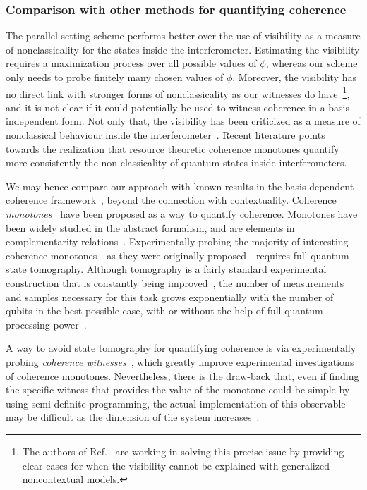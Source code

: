 \documentclass[a4paper,twocolumn,11pt,accepted=2024-01-17]{quantumarticle}
\begin{document}
\subsubsection{Comparison with other methods for quantifying coherence}
The parallel setting scheme performs better over the use of visibility as a measure of nonclassicality for the states inside the interferometer. Estimating the visibility requires a maximization process over all possible values of $\phi$, whereas our scheme only needs to probe finitely many chosen values of $\phi$. Moreover, the visibility has no direct link with stronger forms of nonclassicality as our witnesses do have~\footnote{The authors of Ref.~\cite{catani2021interference} are working in solving this precise issue by providing clear cases for when the visibility cannot be explained with generalized noncontextual models.}, and it is not clear if it could potentially be used to witness coherence in a basis-independent form. Not only that, the visibility has been criticized as a measure of nonclassical behaviour inside the interferometer~\cite{chrysosthemos_quantum_2022}. Recent literature points towards the realization that resource theoretic coherence monotones quantify more consistently the non-classicality of quantum states inside interferometers.


We may hence compare our approach with known results in the basis-dependent coherence framework~\cite{baumgratz2014quantifying,wu2021experimental}, beyond the connection with contextuality. Coherence \textit{monotones}~\cite{Streltsov17,wu2021experimental} have been proposed as a way to quantify coherence. Monotones have been widely studied in the abstract formalism, and are elements in complementarity relations~\cite{Streltsov17,wu2021experimental}. Experimentally probing the majority of interesting coherence monotones - as they were originally proposed - requires full quantum state tomography. Although tomography is a fairly standard experimental construction that is constantly being improved~\cite{rambach2021robust}, the number of measurements and samples necessary for this task grows exponentially with the number of qubits in the best possible case, with or without the help of full quantum processing power~\cite{chen2022tight}. 

A way to avoid state tomography for quantifying coherence is via experimentally probing \textit{coherence witnesses}~\cite{zhang2018estimating,wu2021experimental,napoli2016robustness,wang2017directly}, which greatly improve experimental investigations of coherence monotones. Nevertheless, there is the draw-back that, even if finding the specific witness that provides the value of the monotone could be simple by using semi-definite programming, the actual implementation of this observable may be difficult as the dimension of the system increases~\cite{zheng2018experimental}. 
\end{document}
